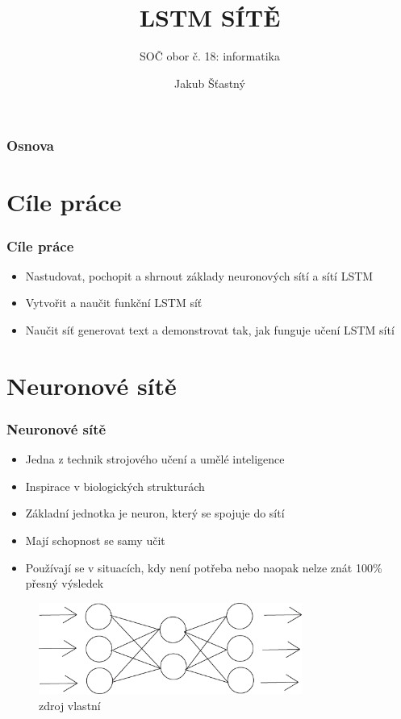 \documentclass{beamer}
\title{LSTM SÍTĚ}
\subtitle{SOČ obor č. 18: informatika}
\institute{Gymnázium Brno-Řečkovice Terezy Novákové 2, p. o.}
\author{Jakub Šťastný}
\begin{document}



        \begin{frame}
            \titlepage
        \end{frame}
        \begin{frame}
                \frametitle{Osnova}
                \tableofcontents
        \end{frame}






	\section{Cíle práce}
	\begin{frame}
        \frametitle{Cíle práce}
        	\begin{itemize}
			\item Nastudovat, pochopit a shrnout základy neuronových sítí a sítí LSTM
			\item Vytvořit a naučit funkční LSTM síť
			\item Naučit síť generovat text a demonstrovat tak, jak funguje učení LSTM sítí
        	\end{itemize}
	\end{frame}



	\section{Neuronové sítě}
	\begin{frame}
	\frametitle{Neuronové sítě}
		\begin{itemize}
			\item Jedna z technik strojového učení a umělé inteligence
			\item Inspirace v biologických strukturách
			\item Základní jednotka je neuron, který se spojuje do sítí
			\item Mají schopnost se samy učit
			\item Používají se v situacích, kdy není potřeba nebo naopak nelze znát 100\% přesný výsledek
		\end{itemize}
		\begin{figure}
			\includegraphics[height=3cm]{neuralNetwork.png} 
			\caption{{\fontsize{5}{6}\selectfont zdroj vlastní}}
		\end{figure}
	\end{frame}
	
\end{document}
